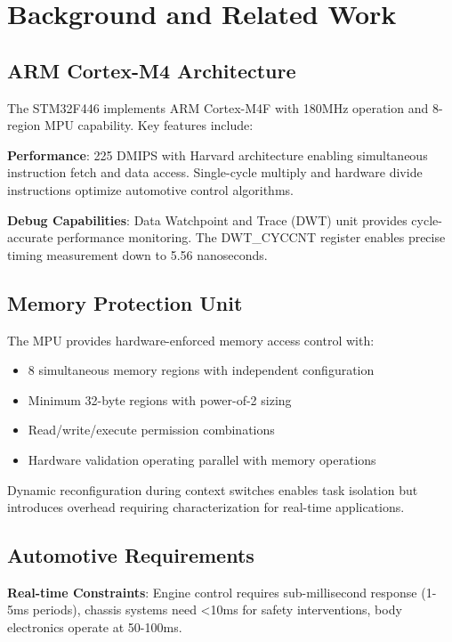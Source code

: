 \chapter{Background and Related Work}
\label{sec:backgrounds}

\section{ARM Cortex-M4 Architecture}

The STM32F446 implements ARM Cortex-M4F with 180MHz operation and 8-region MPU capability. Key features include:

\textbf{Performance}: 225 DMIPS with Harvard architecture enabling simultaneous instruction fetch and data access. Single-cycle multiply and hardware divide instructions optimize automotive control algorithms.

\textbf{Debug Capabilities}: Data Watchpoint and Trace (DWT) unit provides cycle-accurate performance monitoring. The DWT\_CYCCNT register enables precise timing measurement down to 5.56 nanoseconds.

\section{Memory Protection Unit}

The MPU provides hardware-enforced memory access control with:
\begin{itemize}
    \item 8 simultaneous memory regions with independent configuration
    \item Minimum 32-byte regions with power-of-2 sizing
    \item Read/write/execute permission combinations
    \item Hardware validation operating parallel with memory operations
\end{itemize}

Dynamic reconfiguration during context switches enables task isolation but introduces overhead requiring characterization for real-time applications.

\section{Automotive Requirements}

\textbf{Real-time Constraints}: Engine control requires sub-millisecond response (1-5ms periods), chassis systems need <10ms for safety interventions, body electronics operate at 50-100ms.

